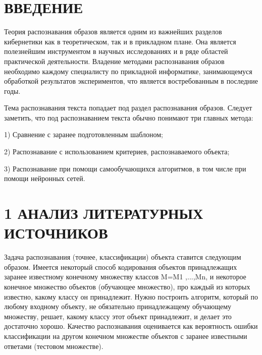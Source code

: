\documentclass[14pt,a4paper]{extreport}
\begin{document}
	
	\newpage
	\pagestyle{plain}
	
	\renewcommand\contentsname{\center\normalsize \textbf{СОДЕРЖАНИЕ} \endcenter}
	\tableofcontents
	\endcenter
	




	\newpage
	\section*{\center\normalsize ВВЕДЕНИЕ \endcenter}
	
	\hspace{4ex} Теория распознавания образов является одним из важнейших разделов кибернетики как в теоретическом, так и в прикладном плане. Она является полезнейшим инструментом в научных исследованиях и в ряде областей практической деятельности. Владение методами распознавания образов необходимо каждому специалисту по прикладной информатике, занимающемуся обработкой результатов экспериментов, что является востребованным в последние годы.\

\hspace{4ex}Тема распознавания текста попадает под раздел распознавания образов. Следует заметить, что под распознаванием текста обычно понимают три главных метода:

\hspace{4ex} 1) Сравнение с заранее подготовленным шаблоном;

\hspace{4ex} 2) Распознавание с использованием критериев, распознаваемого объекта;

\hspace{4ex} 3) Распознавание при помощи самообучающихся алгоритмов, в том числе при помощи нейронных сетей.\





	\newpage
	\section*{\normalsize\hspace{4ex}1 АНАЛИЗ ЛИТЕРАТУРНЫХ ИСТОЧНИКОВ}
	
	 
\hspace{4ex} Задача распознавания (точнее, классификации) объекта ставится следующим образом. Имеется некоторый способ кодирования объектов принадлежащих заранее известному конечному множеству классов M={M1  ,...,Mn}, и некоторое конечное множество объектов (обучающее множество), про каждый из которых известно, какому классу он принадлежит. Нужно построить алгоритм, который по любому входному объекту, не обязательно принадлежащему обучающему множеству, решает, какому классу этот объект принадлежит, и делает это достаточно хорошо. Качество распознавания оценивается как вероятность ошибки классификации на другом конечном множестве объектов с заранее известными ответами (тестовом множестве).\
 
\end{document}
